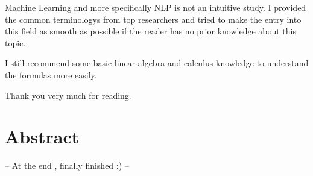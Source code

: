 Machine Learning and more specifically NLP is not an intuitive study. I provided the common terminologys from top researchers and tried to make the entry into this field as smooth as possible if the reader has no prior knowledge about this topic.

I still recommend some basic linear algebra and calculus knowledge to understand the formulas more easily.

Thank you very much for reading.

\newpage

\section*{Abstract}
\label{sec:abstract}

-- At the end , finally finished :) --
